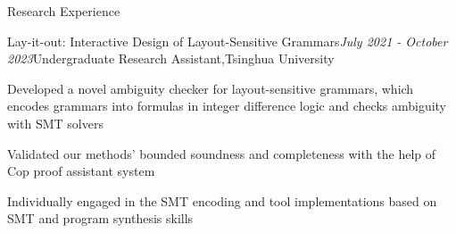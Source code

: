 \documentclass{resume} %
\newcommand{\Jul}{July }
\newcommand{\Oct}{October }
\begin{document}
\begin{rSection}{Research Experience}
\begin{rSubsection}{Lay-it-out: Interactive Design of Layout-Sensitive Grammars}{\em \Jul 2021 - \Oct 2023}{Undergraduate Research Assistant,\textup{Tsinghua University}}{}
    
\item Developed a novel ambiguity checker for layout-sensitive grammars, which encodes grammars into formulas in integer difference logic and checks ambiguity with SMT solvers
\item Validated our methods' bounded soundness and completeness with the help of Cop proof assistant system
\item Individually engaged in the SMT encoding and tool implementations based on SMT and program synthesis skills

 \end{rSubsection}
    

\end{rSection}



    
\end{document}
